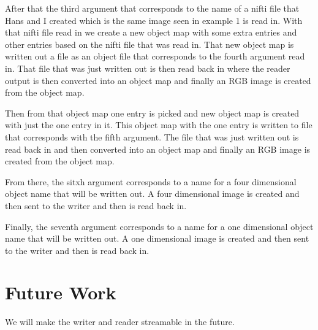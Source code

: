 \documentclass{InsightArticle}
\begin{document}
After that the third argument that corresponds to the name of a nifti file that Hans and I created which is the same image seen in example 1 is read in.  With that nifti file read in we create a new object map with some extra entries and other entries based on the nifti file that was read in.  That new object map is written out a file as an object file that corresponds to the fourth argument read in.  That file that was just written out is then read back in where the reader output is then converted into an object map and finally an RGB image is created from the object map.  

Then from that object map one entry is picked and new object map is created with just the one entry in it.  This object map with the one entry is written to file that corresponds with the fifth argument.  The file that was just written out is read back in and then converted into an object map and finally an RGB image is created from the object map.

From there, the sitxh argument corresponds to a name for a four dimensional object name that will be written out.  A four dimensional image is created and then sent to the writer and then is read back in.

Finally, the seventh argument corresponds to a name for a one dimensional object name that will be written out.  A one dimensional image is created and then sent to the writer and then is read back in.

\section{Future Work}

We will make the writer and reader streamable in the future.


%
%



\end{document}
